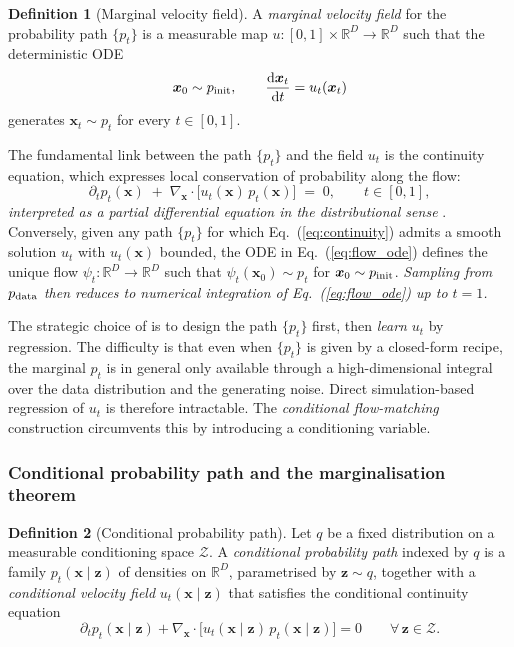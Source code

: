 \documentclass[11pt]{article}
\newcommand{\dd}{\mathrm{d}}
\DeclareRobustCommand{\xvec}{\bm{x}}
\DeclareRobustCommand{\zvec}{\bm{z}}
\newcommand{\pinit}{p_{\rm init}}
\newcommand{\pdata}{p_{\rm data}}
\newcommand{\Ndata}{\mathbb{R}^{D}}
\theoremstyle{definition}
\newtheorem{definition}{Definition}[section]
\begin{document}
\begin{definition}[Marginal velocity field]
\label{def:marg_vf}
A \emph{marginal velocity field} for the probability path $\{p_t\}$ is a measurable map $u:[0,1]\!\times\!\Ndata\!\to\!\Ndata$ such that the deterministic ODE
\begin{equation}
  \xvec_0\sim\pinit,
  \qquad
  \frac{\dd \xvec_t}{\dd t} = u_t(\xvec_t)
  \label{eq:flow_ode}
\end{equation}
generates $\xvec_t\sim p_t$ for every $t\in[0,1]$.
\end{definition}

The fundamental link between the path $\{p_t\}$ and the field $u_t$ is the continuity equation, which expresses local conservation of probability along the flow:
\begin{equation}
  \partial_t p_t(\xvec) \;+\; \nabla_{\xvec}\!\cdot\!\bigl[u_t(\xvec)\,p_t(\xvec)\bigr] \;=\; 0,
  \qquad t\in[0,1],
  \label{eq:continuity}
\end{equation}
\emph{interpreted as a partial differential equation in the distributional sense} \cite{lipman2023flowmatching}. Conversely, given any path $\{p_t\}$ for which Eq.~(\ref{eq:continuity}) admits a smooth solution $u_t$ with $u_t(\xvec)$ bounded, the ODE in Eq.~(\ref{eq:flow_ode}) defines the unique flow $\psi_t:\Ndata\to\Ndata$ such that $\psi_t(\xvec_0)\sim p_t$ for $\xvec_0\sim\pinit$. \emph{Sampling from $\pdata$ then reduces to numerical integration of Eq.~(\ref{eq:flow_ode}) up to $t=1$.}

The strategic choice of \cite{lipman2023flowmatching} is to design the path $\{p_t\}$ first, then \emph{learn} $u_t$ by regression. The difficulty is that even when $\{p_t\}$ is given by a closed-form recipe, the marginal $p_t$ is in general only available through a high-dimensional integral over the data distribution and the generating noise. Direct simulation-based regression of $u_t$ is therefore intractable. The \emph{conditional flow-matching} construction circumvents this by introducing a conditioning variable.

\subsubsection{Conditional probability path and the marginalisation theorem}

\begin{definition}[Conditional probability path]
\label{def:cond_path}
Let $q$ be a fixed distribution on a measurable conditioning space $\mathcal Z$. A \emph{conditional probability path} indexed by $q$ is a family $p_t(\xvec\mid\zvec)$ of densities on $\Ndata$, parametrised by $\zvec\sim q$, together with a \emph{conditional velocity field} $u_t(\xvec\mid\zvec)$ that satisfies the conditional continuity equation
\begin{equation}
  \partial_t p_t(\xvec\mid\zvec) + \nabla_{\xvec}\!\cdot\!\bigl[u_t(\xvec\mid\zvec)\,p_t(\xvec\mid\zvec)\bigr] = 0
  \qquad \forall\,\zvec\in\mathcal Z.
  \label{eq:cond_continuity}
\end{equation}
\end{definition}
\end{document}
